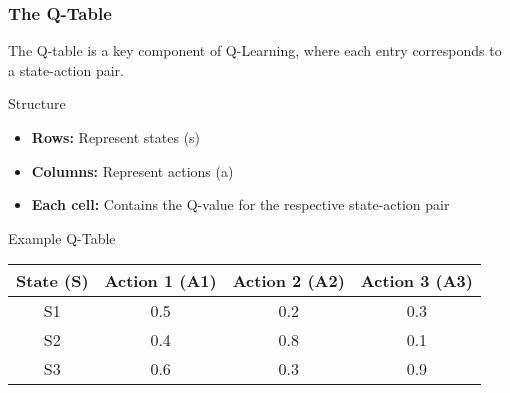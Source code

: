 \documentclass[aspectratio=169]{beamer}
\begin{document}
\begin{frame}[fragile]
    \frametitle{The Q-Table}
    The Q-table is a key component of Q-Learning, where each entry corresponds to a state-action pair.
    
    \begin{block}{Structure}
        \begin{itemize}
            \item \textbf{Rows:} Represent states (s)
            \item \textbf{Columns:} Represent actions (a)
            \item \textbf{Each cell:} Contains the Q-value for the respective state-action pair
        \end{itemize}
    \end{block}

    \begin{block}{Example Q-Table} 
        \begin{tabular}{|c|c|c|c|}
            \hline
            State (S) & Action 1 (A1) & Action 2 (A2) & Action 3 (A3) \\
            \hline
            S1 & 0.5 & 0.2 & 0.3 \\
            S2 & 0.4 & 0.8 & 0.1 \\
            S3 & 0.6 & 0.3 & 0.9 \\
            \hline
        \end{tabular}
    \end{block}
\end{frame}
\end{document}
